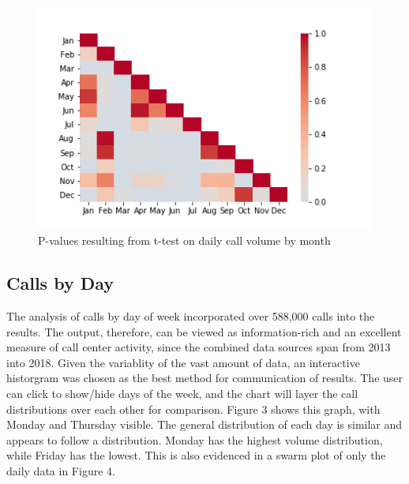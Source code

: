 \documentclass[11pt,twocolumn]{article}
\begin{document}
\begin{figure}[h]
	\includegraphics[scale=.5]{Heatmap.png}
	\caption{P-values resulting from t-test on daily call volume by month}
\end{figure}


	\subsection{Calls by Day}

The analysis of calls by day of week incorporated over 588,000 calls into the results.  The output, therefore, can be viewed as information-rich and an excellent measure of call center activity, since the combined data sources span from 2013 into 2018.  Given the variablity of the vast amount of data, an interactive historgram was chosen as the best method for communication of results.  The user can click to show/hide days of the week, and the chart will layer the call distributions over each other for comparison.  Figure 3 shows this graph, with Monday and Thursday visible.  The general distribution of each day is similar and appears to follow a 
distribution.  Monday has the highest volume distribution, while Friday has the lowest.  This is also evidenced in a swarm plot of only the daily data in Figure 4.
\end{document}
